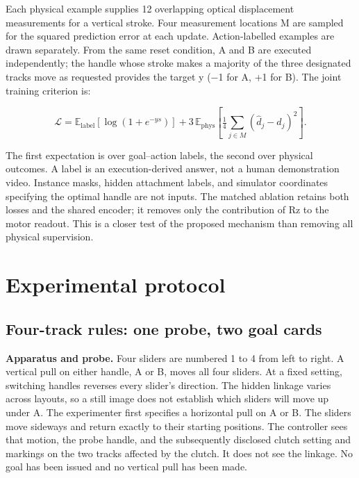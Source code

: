\documentclass[11pt]{article}
\begin{document}
Each physical example supplies 12 overlapping optical displacement measurements for a vertical stroke. Four measurement locations M are sampled for the squared prediction error at each update. Action-labelled examples are drawn separately. From the same reset condition, A and B are executed independently; the handle whose stroke makes a majority of the three designated tracks move as requested provides the target y (\ensuremath{-}1 for A, +1 for B). The joint training criterion is:

\begin{equation*}
\mathcal L=\mathbb E_{\mathrm{label}}\!\left[\log(1+e^{-ys})\right]+3\,\mathbb E_{\mathrm{phys}}\!\left[\tfrac14\sum_{j\in M}(\hat d_j-d_j)^2\right].\tag{4}
\end{equation*}

The first expectation is over goal--action labels, the second over physical outcomes. A label is an execution-derived answer, not a human demonstration video. Instance masks, hidden attachment labels, and simulator coordinates specifying the optimal handle are not inputs. The matched ablation retains both losses and the shared encoder; it removes only the contribution of Rz to the motor readout. This is a closer test of the proposed mechanism than removing all physical supervision.

\FloatBarrier\section{Experimental protocol}

\subsection{Four-track rules: one probe, two goal cards}

\textbf{Apparatus and probe.} Four sliders are numbered 1 to 4 from left to right. A vertical pull on either handle, A or B, moves all four sliders. At a fixed setting, switching handles reverses every slider's direction. The hidden linkage varies across layouts, so a still image does not establish which sliders will move up under A. The experimenter first specifies a horizontal pull on A or B. The sliders move sideways and return exactly to their starting positions. The controller sees that motion, the probe handle, and the subsequently disclosed clutch setting and markings on the two tracks affected by the clutch. It does not see the linkage. No goal has been issued and no vertical pull has been made.
\end{document}
